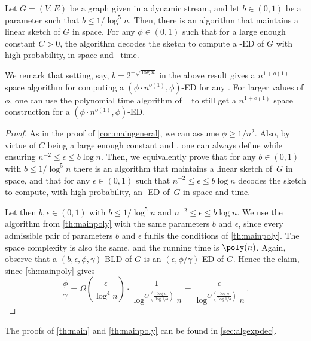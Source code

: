 \begin{mainthactual}
	\label{cor:mainpolygeneral}
	Let $G=(V, E)$ be a graph given in a dynamic stream, and let $b \in (0,1)$ be a parameter such that $b \le 1/\log^5 n$. Then, there is an algorithm that maintains a linear sketch of $G$ in  space. For any {$\phi \in (0,1)$} such that  for a large enough constant $C>0$, the algorithm decodes the sketch to compute a -ED of $G$  with high probability, in  space and~ time.
\end{mainthactual}
\noindent
We remark that setting, say, $b = 2^{-\sqrt{\log n}}$  in the above result gives a $n^{1+o(1)}$ space algorithm for computing a $(\phi \cdot n^{o(1)}, \phi)$-ED for any . For larger values of $\phi$, one can use the polynomial time algorithm of ~\cite{streamexpdec} to still get a $n^{1+o(1)}$ space construction for a  $(\phi \cdot n^{o(1)}, \phi)$-ED.
\begin{proof}
	As in the proof of \cref{cor:maingeneral}, we can assume $\phi \ge 1/n^2$. Also, by virtue of $C$ being a large enough constant and  , one can always define  while ensuring $n^{-2} \le \epsilon \le b \log n$. Then, we equivalently prove that for any $b \in (0,1)$ with $b \le 1/\log^5 n$ there is an algorithm that maintains a linear sketch of~$G$ in  space, and that for any $\epsilon \in (0,1)$ such that $n^{-2} \le \epsilon \le b \log n$ decodes the sketch to compute, with high probability, an -ED of~$G$ in  space and  time.
	
	Let then $b,\epsilon \in (0,1)$ with $b \le 1/\log^5 n$ and $n^{-2} \le \epsilon \le b \log n$. We use the algorithm from \cref{th:mainpoly} with the same parameters $b$ and $\epsilon$, since every admissible pair of parameters $b$ and $\epsilon$ fulfils the conditions of \cref{th:mainpoly}. The space complexity is also the same, and the running time is $\poly(n)$. Again, observe that a $(b, \epsilon, \phi, \gamma)$-BLD of $G$ is an $(\epsilon,\phi/\gamma)$-ED of $G$. Hence the claim, since \cref{th:mainpoly} gives
	\begin{equation*}
		\frac{\phi}{\gamma} = \Omega\left(\frac{\epsilon}{\log^4 n}\right) \cdot \frac{1}{\log^{O\left(\frac{\log n}{\log 1/b}\right)} n} = \frac{\epsilon}{\log^{O\left(\frac{\log n}{\log 1/b}\right)} n} \, .
	\end{equation*}
\end{proof}

\noindent
The proofs of \cref{th:main} and \cref{th:mainpoly} can be found in \cref{sec:algexpdec}.
